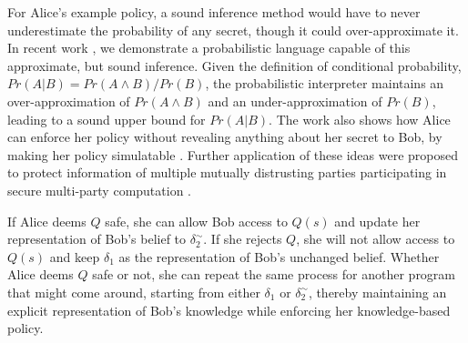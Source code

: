 \documentclass{article} %
\newcommand{\pxm}[1]{\textcolor{red}{PM -- #1}}
\newcommand{\sconst}[1]{\ensuremath{\mathsf{#1}}}
\newcommand{\strue}{\sconst{True}}
\newcommand{\sfalse}{\sconst{False}}
\newcommand{\paren}[1]{\left( #1 \right)}
\newcommand{\acond}[0]{|^\sim}
\newcommand{\stacklabel}[1]{\stackrel{\smash{\scriptscriptstyle \mathrm{#1}}}}
\newcommand{\defeq}{\stacklabel{def}=}
\theoremstyle{plain} %
\theoremstyle{definition} %
\begin{document}
For Alice's example policy, a sound inference method would have to
never underestimate the probability of any secret, though it could
over-approximate it. In recent work \cite{mardziel11belief}, we
demonstrate a probabilistic language capable of this approximate, but
sound inference. Given the definition of conditional probability, $
Pr(A | B) = Pr(A \wedge B) / Pr(B) $, the probabilistic interpreter
maintains an over-approximation of $ Pr(A \wedge B) $ and an
under-approximation of $ Pr(B) $, leading to a sound upper bound for $
Pr(A | B) $. The work also shows how Alice can enforce her policy
without revealing anything about her secret to Bob, by making her
policy simulatable \cite{kenthapadi05simulatable}. Further application
of these ideas were proposed to protect information of multiple
mutually distrusting parties participating in secure multi-party
computation \cite{mardziel12smc}.

%
%

%

If Alice deems $ Q $ safe, she can allow Bob access to $ Q(s) $
and update her representation of Bob's belief to $
\delta_2^\sim $. If she rejects $ Q $, she will not allow access to $ Q(s) $ and keep
$ \delta_1 $ as the representation of Bob's unchanged belief. Whether
Alice deems $ Q $ safe or not, she can repeat the same process for
another program that might come around, starting from either $ \delta_1
$ or $ \delta_2^\sim $, thereby maintaining an explicit representation
of Bob's knowledge while enforcing her knowledge-based policy.
\end{document}
